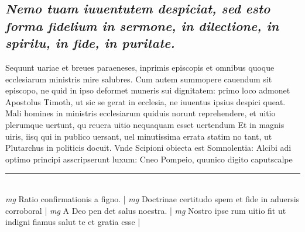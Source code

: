 \documentclass{article}
\begin{document}
\begin{pages}
{}
\subsection*{\textit{Nemo tuam iuuentutem despiciat, sed esto forma fidelium in sermone, in dilectione, in spiritu, in fide, in puritate. }}\pstart Sequunt uariae et breues paraeneses, inprimis episcopis et omnibus quoque ecclesiarum ministris mire salubres. Cum autem summopere cauendum sit episcopo, ne quid in ipso deformet muneris sui dignitatem: primo loco admonet Apostolus Timoth, ut sic se gerat in ecclesia, ne iuuentus ipsius despici queat. Mali homines in ministris ecclesiarum quiduis norunt reprehendere, et uitio plerumque uertunt, qu reuera uitio nequaquam esset uertendum Et in magnis uiris, iisq qui in publico uersant, uel minutissima errata statim no tant, ut Plutarchus in politicis docuit. Vnde Scipioni obiecta est Somnolentia: Alcibi adi optimo principi asscripserunt luxum: Cneo Pompeio, quunico digito caputscalpe\pend
\vspace{0.5cm}\noindent
\vspace{0.2cm}\rule{1cm}{0.2pt}\\ 
\hspace{0.2cm}\textit{mg}
\footnotesize Ratio confirmationis a figno. 
\normalsize| 
\hspace{0.2cm}\textit{mg}
\footnotesize Doctrinae certitudo spem et fide in aduersis corroboral 
\normalsize| 
\hspace{0.2cm}\textit{mg}
\footnotesize A Deo pen det salus noestra. 
\normalsize| 
\hspace{0.2cm}\textit{mg}
\footnotesize Nostro ipse rum uitio fit ut indigni fiamus salut te et gratia csse 
\normalsize| 

\end{pages}
\end{document}
